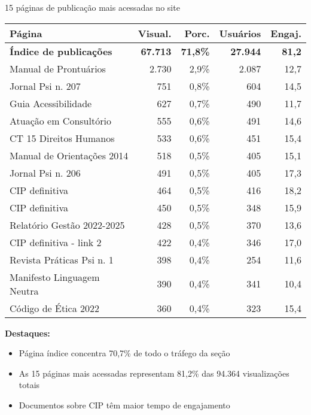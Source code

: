 \documentclass{beamer}
\begin{document}
\begin{frame}{15 páginas de publicação mais acessadas no site}
	\centering
	{\tiny
	\begin{tabular}{lrrrr}
		\toprule
		\textbf{Página} & \textbf{Visual.} & \textbf{Porc.} & \textbf{Usuários} & \textbf{Engaj.} \\
		\midrule
		\textbf{Índice de publicações} & \textbf{67.713} & \textbf{71,8\%} & \textbf{27.944} & \textbf{81,2} \\
		\midrule
		Manual de Prontuários & 2.730 & 2,9\% & 2.087 & 12,7 \\
		Jornal Psi n. 207 & 751 & 0,8\% & 604 & 14,5 \\
		Guia Acessibilidade & 627 & 0,7\% & 490 & 11,7 \\
		Atuação em Consultório & 555 & 0,6\% & 491 & 14,6 \\
		CT 15 Direitos Humanos & 533 & 0,6\% & 451 & 15,4 \\
		Manual de Orientações 2014 & 518 & 0,5\% & 405 & 15,1 \\
		Jornal Psi n. 206 & 491 & 0,5\% & 405 & 17,3 \\
		CIP definitiva & 464 & 0,5\% & 416 & 18,2 \\
		CIP definitiva & 450 & 0,5\% & 348 & 15,9 \\
		Relatório Gestão 2022-2025 & 428 & 0,5\% & 370 & 13,6 \\
		CIP definitiva - link 2  & 422 & 0,4\% & 346 & 17,0 \\
		Revista Práticas Psi n. 1 & 398 & 0,4\% & 254 & 11,6 \\
		Manifesto Linguagem Neutra & 390 & 0,4\% & 341 & 10,4 \\
		Código de Ética 2022 & 360 & 0,4\% & 323 & 15,4 \\
		\bottomrule
	\end{tabular}
	}

	\vspace{0.4cm}
	{\scriptsize
	\textbf{Destaques:}
	\begin{itemize}
		\item Página índice concentra \alert{70,7\%} de todo o tráfego da seção
		\item As 15 páginas mais acessadas representam \alert{81,2\%} das 94.364 visualizações totais
		\item Documentos sobre \alert{CIP} têm maior tempo de engajamento
	\end{itemize}
	}
\end{frame}
\end{document}

